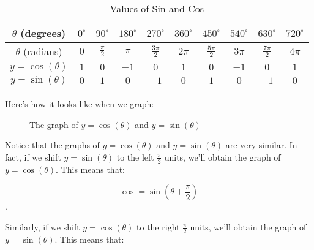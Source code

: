\begin{table}[htpb]
  \label{tab:values_of_sin_and_cos}
  \centering

  \begin{tabular}{|c|c|c|c|c|c|c|c|c|c|}
    \hline
    $\theta$ (degrees) & $0^{\circ}$ & $90^{\circ}$ & $180^{\circ}$ & $270^{\circ}$ & $360^{\circ}$ & $450^{\circ}$ & $540^{\circ}$ & $630^{\circ}$ & $720^{\circ}$ \\
    \hline
    $\theta$ (radians) & $0$ & $\frac{\pi}{2}$ & $\pi$ & $\frac{3\pi}{2}$ & $2\pi$ & $\frac{5\pi}{2}$ & $3\pi$ & $\frac{7\pi}{2}$ & $4\pi$ \\
    \hline
    $y = \cos (\theta)$ & $1$ & $0$ & $-1$ & $0$ & $1$ & $0$ & $-1$ & $0$ & $1$ \\
    \hline
    $y = \sin (\theta)$ & $0$ & $1$ & $0$ & $-1$ & $0$ & $1$ & $0$ & $-1$ & $0$ \\
    \hline
  \end{tabular}

  \caption{Values of Sin and Cos}
\end{table}

Here's how it looks like when we graph:

\begin{figure}[htpb]
	\centering


  \caption{The graph of {\color{red}$y = \cos(\theta)$} and {\color{blue}$y = \sin(\theta)$}}
  \label{fig:the_graph_of_y_cos_theta_and_y_sin_theta_2}
\end{figure}

Notice that the graphs of $y = \cos (\theta)$ and $y = \sin (\theta)$ are very
similar. In fact, if we shift $y = \sin (\theta)$ to the left $\frac{\pi}{2}$
units, we'll obtain the graph of $y = \cos (\theta)$. This means that:

\[ \cos = \sin \left(\theta + \frac{\pi}{2}\right) \].

Similarly, if we shift $y = \cos (\theta)$ to the right $\frac{\pi}{2}$ units,
we'll obtain the graph of $y = \sin (\theta)$. This means that:

